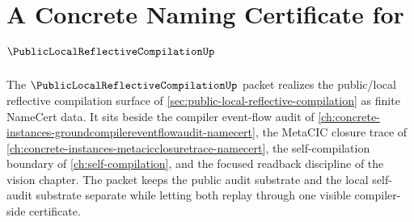 \chapter{A Concrete Naming Certificate for $\PublicLocalReflectiveCompilationUp$}
\label{ch:concrete-instances-public-local-reflective-compilation-namecert}

The $\PublicLocalReflectiveCompilationUp$ packet realizes the public/local reflective compilation surface of \autoref{sec:public-local-reflective-compilation} as finite NameCert data. It sits beside the compiler event-flow audit of \autoref{ch:concrete-instances-groundcompilereventflowaudit-namecert}, the MetaCIC closure trace of \autoref{ch:concrete-instances-metacicclosuretrace-namecert}, the self-compilation boundary of \autoref{ch:self-compilation}, and the focused readback discipline of the vision chapter. The packet keeps the public audit substrate and the local self-audit substrate separate while letting both replay through one visible compiler-side certificate.


